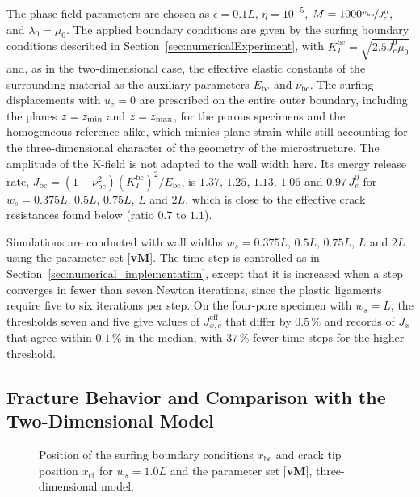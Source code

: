 \documentclass[pdflatex,sn-mathphys-num]{sn-jnl}%
\newcommand{\vMLabel}{[\textbf{vM}]\xspace}
\theoremstyle{thmstyleone}%
\theoremstyle{thmstyletwo}%
\theoremstyle{thmstylethree}%
\begin{document}
The phase-field parameters are chosen as $\epsilon = 0.1L$, $\eta = 10^{-5}$, $M = 1000 \nicefrac{v_{\text{bc}}}{J_c^0}$, and $\lambda_0=\mu_0$. The applied boundary conditions are given by the surfing boundary conditions described in Section~\ref{sec:numericalExperiment}, with $K_I^{\text{bc}}=\sqrt{2.5J_c^0\mu_0}$ and, as in the two-dimensional case, the effective elastic constants of the surrounding material as the auxiliary parameters $E_{\text{bc}}$ and $\nu_{\text{bc}}$. The surfing displacements with $u_z = 0$ are prescribed on the entire outer boundary, including the planes $z=z_{\rm min}$ and $z=z_{\rm max}$, for the porous specimens and the homogeneous reference alike, which mimics plane strain while still accounting for the three-dimensional character of the geometry of the microstructure. The amplitude of the K-field is not adapted to the wall width here. Its energy release rate, $J_{\text{bc}} = (1-\nu_{\text{bc}}^2)(K_I^{\text{bc}})^2/E_{\text{bc}}$, is $1.37$, $1.25$, $1.13$, $1.06$ and $0.97\,J_c^0$ for $w_s = 0.375L$, $0.5L$, $0.75L$, $L$ and $2L$, which is close to the effective crack resistances found below (ratio $0.7$ to $1.1$).

Simulations are conducted with wall widths $w_s = 0.375L$, $0.5L$, $0.75L$, $L$ and $2L$ using the parameter set \vMLabel. The time step is controlled as in Section~\ref{sec:numerical_implementation}, except that it is increased when a step converges in fewer than seven Newton iterations, since the plastic ligaments require five to six iterations per step. On the four-pore specimen with $w_s = L$, the thresholds seven and five give values of $J_{x,c}^{\text{eff}}$ that differ by $0.5\,\%$ and records of $J_x$ that agree within $0.1\,\%$ in the median, with $37\,\%$ fewer time steps for the higher threshold.

\subsection{Fracture Behavior and Comparison with the Two-Dimensional Model}
\label{sec:3D_fracture_behavior}

\begin{figure}[htb]
    \centering
    \resizebox{0.45\textwidth}{!}{}%
    \caption{Position of the surfing boundary conditions $x_{\text{bc}}$ and crack tip position $x_{\text{ct}}$ for $w_s=1.0L$ and the parameter set \vMLabel, three-dimensional model.}
    \label{fig:position_3D}
\end{figure}
\end{document}
